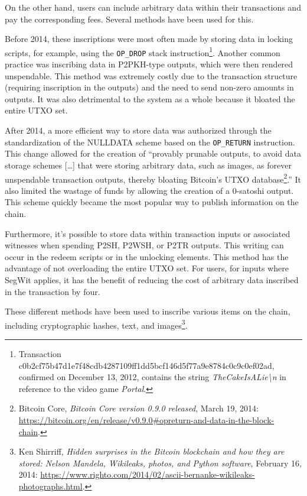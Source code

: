 \documentclass[
  a5paper,
  smalldemyvopaper,10pt,twoside,onecolumn,openright,extrafontsizes,hidelinks]{memoir}
\begin{document}
On the other hand, users can include arbitrary data within their
transactions and pay the corresponding fees. Several methods have been
used for this.

Before 2014, these inscriptions were most often made by storing data in
locking scripts, for example, using the \texttt{OP\_DROP} stack
instruction\footnote{Transaction
  c0b2cf75b47d1e7f48cdb4287109ff1dd5bcf146d5f77a9e8784c0c9c0ef02ad,
  confirmed on December 13, 2012, contains the string
  \emph{TheCakeIsALie\textbackslash n} in reference to the video game
  \emph{Portal}.}. Another common practice was inscribing data in
P2PKH-type outputs, which were then rendered unspendable. This method
was extremely costly due to the transaction structure (requiring
inscription in the outputs) and the need to send non-zero amounts in
outputs. It was also detrimental to the system as a whole because it
bloated the entire UTXO set.

After 2014, a more efficient way to store data was authorized through
the standardization of the NULLDATA scheme based on the
\texttt{OP\_RETURN} instruction. This change allowed for the creation of
``provably prunable outputs, to avoid data storage schemes {[}\ldots{]}
that were storing arbitrary data, such as images, as forever unspendable
transaction outputs, thereby bloating Bitcoin's UTXO
database\footnote{Bitcoin Core, \emph{Bitcoin Core version 0.9.0
  released}, March 19, 2014:
  \url{https://bitcoin.org/en/release/v0.9.0\#opreturn-and-data-in-the-block-chain}.}.''
It also limited the wastage of funds by allowing the creation of a
0-satoshi output. This scheme quickly became the most popular way to
publish information on the chain.

Furthermore, it's possible to store data within transaction inputs or
associated witnesses when spending P2SH, P2WSH, or P2TR outputs. This
writing can occur in the redeem scripts or in the unlocking elements.
This method has the advantage of not overloading the entire UTXO set.
For users, for inputs where SegWit applies, it has the benefit of
reducing the cost of arbitrary data inscribed in the transaction by
four.

These different methods have been used to inscribe various items on the
chain, including cryptographic hashes, text, and images\footnote{Ken
  Shirriff, \emph{Hidden surprises in the Bitcoin blockchain and how
  they are stored: Nelson Mandela, Wikileaks, photos, and Python
  software}, February 16, 2014:
  \url{https://www.righto.com/2014/02/ascii-bernanke-wikileaks-photographs.html}.}.
\end{document}
